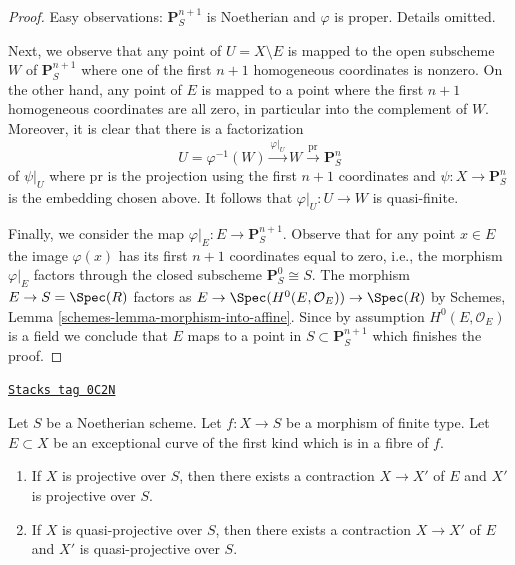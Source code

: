 \begin{proof}
\medskip\noindent
Easy observations: $\mathbf{P}^{n + 1}_S$ is Noetherian and $\varphi$ is proper.
Details omitted.

\medskip\noindent
Next, we observe that any point of $U = X \setminus E$ is mapped
to the open subscheme $W$ of $\mathbf{P}^{n + 1}_S$ where one of the
first $n + 1$ homogeneous coordinates is nonzero. On the other hand,
any point of $E$ is mapped to a point where the first $n + 1$ homogeneous
coordinates are all zero, in particular into the complement of $W$.
Moreover, it is clear that there is a factorization
$$
U = \varphi^{-1}(W) \xrightarrow{\varphi|_U}
W \xrightarrow{\text{pr}} \mathbf{P}^n_S
$$
of $\psi|_U$ where $\text{pr}$ is the projection using the first
$n + 1$ coordinates and $\psi : X \to \mathbf{P}^n_S$ is the embedding chosen
above. It follows that $\varphi|_U : U \to W$ is quasi-finite.

\medskip\noindent
Finally, we consider the map $\varphi|_E : E \to \mathbf{P}^{n + 1}_S$.
Observe that for any point $x \in E$ the image $\varphi(x)$
has its first $n + 1$ coordinates equal to zero, i.e., the morphism
$\varphi|_E$ factors through the closed subscheme
$\mathbf{P}^0_S \cong S$. The morphism $E \to S = \Spec(R)$
factors as $E \to \Spec(H^0(E, \mathcal{O}_E)) \to \Spec(R)$
by Schemes, Lemma \ref{schemes-lemma-morphism-into-affine}.
Since by assumption $H^0(E, \mathcal{O}_E)$ is a field we conclude
that $E$ maps to a point in $S \subset \mathbf{P}^{n + 1}_S$
which finishes the proof.
\end{proof}

\begin{lemma}
\label{resolve-lemma-contract-when-quasi-projective}
\href{https://stacks.math.columbia.edu/tag/0C2N}{\texttt{Stacks tag 0C2N}}

Let $S$ be a Noetherian scheme. Let $f : X \to S$ be a morphism of finite type.
Let $E \subset X$ be an exceptional curve of the first kind which is in a
fibre of $f$.
\begin{enumerate}
\item If $X$ is projective over $S$, then there exists a contraction
$X \to X'$ of $E$ and $X'$ is projective over $S$.
\item If $X$ is quasi-projective over $S$, then there exists a contraction
$X \to X'$ of $E$ and $X'$ is quasi-projective over $S$.
\end{enumerate}
\end{lemma}

